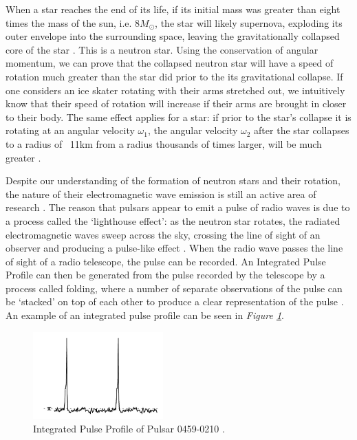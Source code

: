 \documentclass{article}
\begin{document}
When a star reaches the end of its life, if its initial mass was greater than eight times the mass of the sun, i.e. $8M_{\odot}$, the star will likely supernova, exploding its outer envelope into the surrounding space, leaving the gravitationally collapsed core of the star \autocite{maoz}. This is a neutron star. Using the conservation of angular momentum, we can prove that the collapsed neutron star will have a speed of rotation much greater than the star did prior to the its gravitational collapse. If one considers an ice skater rotating with their arms stretched out, we intuitively know that their speed of rotation will increase if their arms are brought in closer to their body. The same effect applies for a star: if prior to the star's collapse it is rotating at an angular velocity $\omega_1$, the angular velocity $\omega_2$ after the star collapses to a radius of ~11km from a radius thousands of times larger, will be much greater \autocite{maoz}. 

Despite our understanding of the formation of neutron stars and their rotation, the nature of their electromagnetic wave emission is still an active area of research \autocite{lorimer}. The reason that pulsars appear to emit a pulse of radio waves is due to a process called the `lighthouse effect': as the neutron star rotates, the radiated electromagnetic waves sweep across the sky, crossing the line of sight of an observer and producing a pulse-like effect \autocite{lorimer}. When the radio wave passes the line of sight of a radio telescope, the pulse can be recorded. An Integrated Pulse Profile can then be generated from the pulse recorded by the telescope by a process called folding, where a number of separate observations of the pulse can be `stacked' on top of each other to produce a clear representation of the pulse \autocite{helfand:profiles}. An example of an integrated pulse profile can be seen in \emph{Figure \ref{fig:profile}}.

\begin{figure}[h!]
    \centering
    \includegraphics[width=5cm]{PSR_0459-0210-profile.jpg}
    \begin{center}
    \caption{Integrated Pulse Profile of Pulsar 0459-0210 \autocite{swainston:data}.}
    \label{fig:profile}
    \end{center}
\end{figure}
\end{document}
